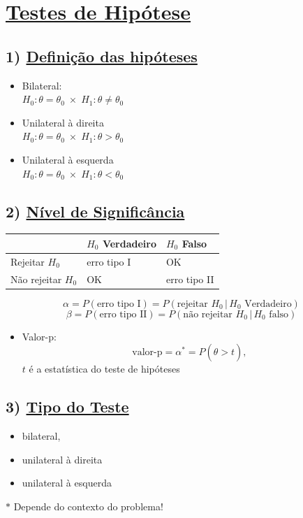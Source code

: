 \documentclass[11pt,a4paper]{article}
\begin{document}
\section*{\underline{Testes de Hipótese}}

\subsection*{1) \underline{Definição das hipóteses}}
\begin{itemize}[label=$\cdot$]
  \item Bilateral: \\
  $H_0: \theta=\theta_0 \;\times\; H_1: \theta\neq\theta_0$
  \item Unilateral à direita \\
  $H_0: \theta=\theta_0 \;\times\; H_1: \theta>\theta_0$
  \item Unilateral à esquerda \\
  $H_0: \theta=\theta_0 \;\times\; H_1: \theta<\theta_0$
\end{itemize}

\subsection*{2) \underline{Nível de Significância}}
\begin{center}
\begin{tabular}{l|l|l}
 & $H_0$ Verdadeiro & $H_0$ Falso \\ \hline
Rejeitar $H_0$ & erro tipo I & OK \\ \hline
Não rejeitar $H_0$ & OK & erro tipo II
\end{tabular}
\end{center}
\[ \alpha = P(\text{erro tipo I}) = P(\text{rejeitar } H_0 \,|\, H_0 \text{ Verdadeiro}) \]
\[ \beta = P(\text{erro tipo II}) = P(\text{não rejeitar } H_0 \,|\, H_0 \text{ falso}) \]
\begin{itemize}[label=$\cdot$]
  \item Valor-p:
  \[ \text{valor-p} = \alpha^* = P(\hat{\theta} > t), \]
  $t$ é a estatística do teste de hipóteses
\end{itemize}

\subsection*{3) \underline{Tipo do Teste}}
\begin{itemize}[label=$\cdot$]
  \item bilateral,
  \item unilateral à direita
  \item unilateral à esquerda
\end{itemize}
$\ast$ Depende do contexto do problema!
\end{document}
